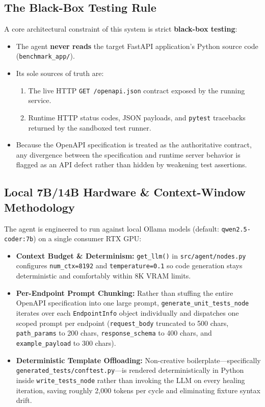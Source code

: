 \documentclass[11pt,a4paper]{article}
\begin{document}
\subsection{The Black-Box Testing Rule}
A core architectural constraint of this system is strict \textbf{black-box testing}:
\begin{itemize}[leftmargin=1.5em]
    \item The agent \textbf{never reads} the target FastAPI application's Python source code (\texttt{benchmark\_app/}).
    \item Its sole sources of truth are:
    \begin{enumerate}[leftmargin=1.5em]
        \item The live HTTP \texttt{GET /openapi.json} contract exposed by the running service.
        \item Runtime HTTP status codes, JSON payloads, and \texttt{pytest} tracebacks returned by the sandboxed test runner.
    \end{enumerate}
    \item Because the OpenAPI specification is treated as the authoritative contract, any divergence between the specification and runtime server behavior is flagged as an API defect rather than hidden by weakening test assertions.
\end{itemize}

\subsection{Local 7B/14B Hardware \& Context-Window Methodology}
The agent is engineered to run against local Ollama models (default: \texttt{qwen2.5-coder:7b}) on a single consumer RTX GPU:
\begin{itemize}[leftmargin=1.5em]
    \item \textbf{Context Budget \& Determinism:} \texttt{get\_llm()} in \texttt{src/agent/nodes.py} configures \texttt{num\_ctx=8192} and \texttt{temperature=0.1} so code generation stays deterministic and comfortably within 8K VRAM limits.
    \item \textbf{Per-Endpoint Prompt Chunking:} Rather than stuffing the entire OpenAPI specification into one large prompt, \texttt{generate\_unit\_tests\_node} iterates over each \texttt{EndpointInfo} object individually and dispatches one scoped prompt per endpoint (\texttt{request\_body} truncated to 500 chars, \texttt{path\_params} to 200 chars, \texttt{response\_schema} to 400 chars, and \texttt{example\_payload} to 300 chars).
    \item \textbf{Deterministic Template Offloading:} Non-creative boilerplate---specifically \texttt{generated\_tests/conftest.py}---is rendered deterministically in Python inside \texttt{write\_tests\_node} rather than invoking the LLM on every healing iteration, saving roughly 2,000 tokens per cycle and eliminating fixture syntax drift.
\end{itemize}
\end{document}
